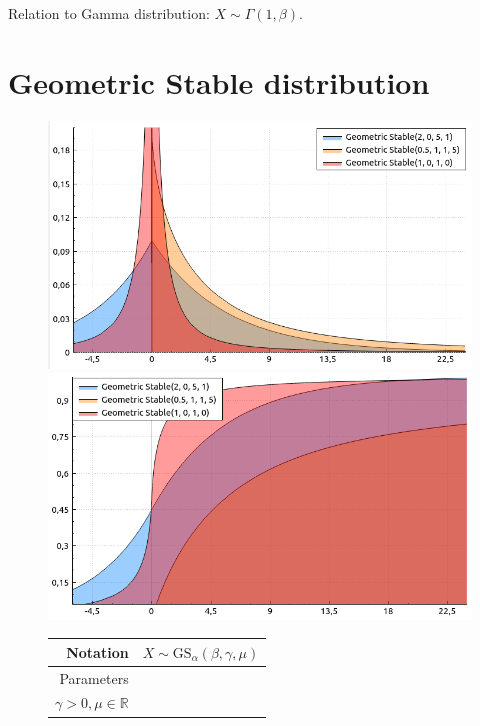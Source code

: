 \documentclass[a4paper,11pt]{article}
\theoremstyle{plain}
\theoremstyle{definition}
\newcommand{\MR}{\mathbb{R}}
\begin{document}
	Relation to Gamma distribution:
	$X \sim \Gamma(1, \beta).$
	
	
	\section{Geometric Stable distribution}
	\begin{figure}[!htb]\centering
		\begin{minipage}{0.55\textwidth}
			\includegraphics[width=\linewidth, right]{geometric_stable_pdf}
			\captionsetup{labelformat=empty}
			\includegraphics[width=\linewidth, right]{geometric_stable_cdf}
			\captionsetup{labelformat=empty}
		\end{minipage}
		\begin{minipage}{0.4\textwidth}
			\begin{tabular}{| r | l |}
				\hline
				Notation & $X \sim \mathrm{GS}_\alpha(\beta, \gamma, \mu)$ \\
				\hline
				Parameters & \pbox{\linewidth}{$\alpha \in (0, 2], \beta \in [-1, 1],$\\ $\gamma > 0, \mu \in \MR $} \\

\end{tabular}
\end{minipage}
\end{figure}
\end{document}
